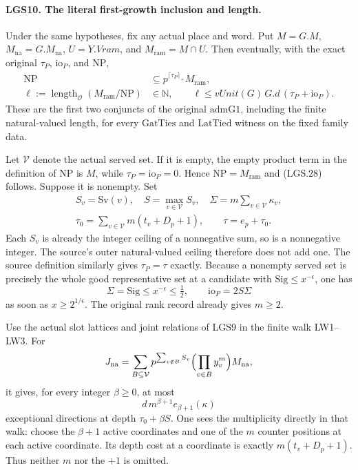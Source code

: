 \paragraph{LGS10. The literal first-growth inclusion and length.}
\label{claim:LGS10}
Under the same hypotheses, fix any actual place and word.
Put \(M=G.M\), \(M_{\mathrm{na}}=G.M_{\mathrm{na}}\),
\(U=Y.Vram\), and \(M_{\mathrm{ram}}=M\cap U\).
Then eventually, with the exact original \(\tau_P\),
\(\mathrm{io}_P\), and \(\mathrm{NP}\),
\[
 \begin{split}
 \mathrm{NP}&\subseteq p^{\lceil\tau_P\rceil_+}M_{\mathrm{ram}},\\
 \ell:=\operatorname{length}_{\mathcal O}
                 (M_{\mathrm{ram}}/\mathrm{NP})&\in\mathbb N,
 \qquad
 \ell\le vUnit(G)\,G.d\,(\tau_P+\mathrm{io}_P).
 \end{split}                                                     \tag{LGS.28}
\]
These are the first two conjuncts of the original
\(\mathrm{admG1}\), including the finite natural-valued
length, for every \(\mathrm{GatTies}\) and
\(\mathrm{LatTied}\) witness on the fixed family data.

Let \(\mathcal V\) denote the actual served set.
If it is empty, the empty product term in the definition
of \(\mathrm{NP}\) is \(M\), while
\(\tau_P=\mathrm{io}_P=0\).  Hence
\(\mathrm{NP}=M_{\mathrm{ram}}\) and (LGS.28) follows.
Suppose it is nonempty.  Set
\[
 \begin{gathered}
 S_v=\mathrm{Sv}(v),\quad S=\max_{v\in\mathcal V}S_v,\quad
 \Sigma=m\sum_{v\in\mathcal V}\kappa_v,\\
 \tau_0=\sum_{v\in\mathcal V}m(t_v+D_p+1),\qquad
 \tau=e_p+\tau_0 .
 \end{gathered}                                                   \tag{LGS.29}
\]
Each \(S_v\) is already the integer ceiling of a
nonnegative sum, so is a nonnegative integer.
The source's outer natural-valued ceiling therefore
does not add one.  The source definition similarly
gives \(\tau_P=\tau\) exactly.
Because a nonempty served set is precisely the whole
good representative set at a candidate with
\(\mathrm{Sig}\le x^{-\epsilon}\), one has
\[
       \Sigma=\mathrm{Sig}\le x^{-\epsilon}\le\tfrac12,
       \qquad \mathrm{io}_P=2S\Sigma                  \tag{LGS.30}
\]
as soon as \(x\ge2^{1/\epsilon}\).
The original rank record already gives \(m\ge2\).

Use the actual slot lattices and joint relations of
LGS9 in the finite walk LW1--LW3.  For
\[
 J_{\mathrm{na}}=
 \sum_{B\subseteq\mathcal V}
     p^{\sum_{v\notin B}S_v}
       \Bigl(\prod_{v\in B}y_v^m\Bigr)M_{\mathrm{na}},
 \]
it gives, for every integer \(\beta\ge0\), at most
\[
               d\,m^{\beta+1}e_{\beta+1}(\kappa)       \tag{LGS.31}
\]
exceptional directions at depth \(\tau_0+\beta S\).
One sees the multiplicity directly in that walk:
choose the \(\beta+1\) active coordinates and one of
the \(m\) counter positions at each active coordinate.
Its depth cost at a coordinate is exactly
\(m(t_v+D_p+1)\).  Thus neither \(m\) nor the \(+1\)
is omitted.

